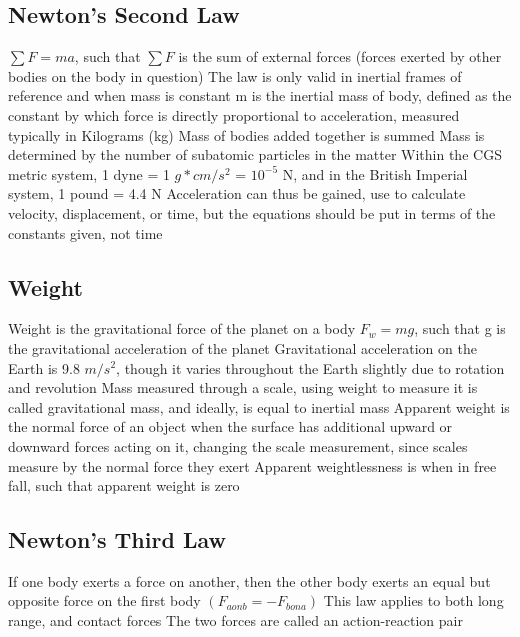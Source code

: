 \documentclass[11 pt, twoside]{article}
\newenvironment{outline*}
{
	\begin{outline}[enumerate]
	}
	{\end{outline}
}
\begin{document}
\subsection{Newton’s Second Law}
\begin{outline*}
\1 $\sum F = ma$, such that $\sum F$ is the sum of external forces (forces exerted by other bodies on the body in question)
\1 The law is only valid in inertial frames of reference and when mass is constant
\1 m is the inertial mass of body, defined as the constant by which force is directly proportional to acceleration, measured typically in Kilograms (kg)
\2 Mass of bodies added together is summed
\2 Mass is determined by the number of subatomic particles in the matter
\2 Within the CGS metric system, 1 dyne = 1 $g*cm/s^2$ = $10^{-5}$ N, and in the British Imperial system, 1 pound = 4.4 N
\1 Acceleration can thus be gained, use to calculate velocity, displacement, or time, but the equations should be put in terms of the constants given, not time
\end{outline*}
\subsection{Weight}
\begin{outline*}
\1 Weight is the gravitational force of the planet on a body
\1 $F_w = mg$, such that g is the gravitational acceleration of the planet
\2 Gravitational acceleration on the Earth is 9.8 $m/s^2$, though it varies throughout the Earth slightly due to rotation and revolution
\2 Mass measured through a scale, using weight to measure it is called gravitational mass, and ideally, is equal to inertial mass
\1 Apparent weight is the normal force of an object when the surface has additional upward or downward forces acting on it, changing the scale measurement, since scales measure by the normal force they exert
\2 Apparent weightlessness is when in free fall, such that apparent weight is zero
\end{outline*}
\subsection{Newton’s Third Law}
\begin{outline*}
\1 If one body exerts a force on another, then the other body exerts an equal but opposite force on the first body $(F_{a on b} = -F_{b on a})$
\2 This law applies to both long range, and contact forces
\2 The two forces are called an action-reaction pair
\end{outline*}
\end{document}
